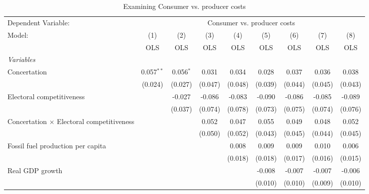 
\begin{table}[htbp]
   \caption{Examining Consumer vs. producer costs}
   \centering
   \begin{tabular}{lcccccccc}
      \toprule
      Dependent Variable: & \multicolumn{8}{c}{Consumer vs. producer costs}\\
      Model:                                           & (1)          & (2)         & (3)     & (4)     & (5)     & (6)     & (7)     & (8)\\  
                                                       &  OLS         & OLS         & OLS     & OLS     & OLS     & OLS     & OLS     & OLS\\  
      \midrule
      \emph{Variables}\\
      Concertation                                     & 0.057$^{**}$ & 0.056$^{*}$ & 0.031   & 0.034   & 0.028   & 0.037   & 0.036   & 0.038\\   
                                                       & (0.024)      & (0.027)     & (0.047) & (0.048) & (0.039) & (0.044) & (0.045) & (0.043)\\   
      Electoral competitiveness                        &              & -0.027      & -0.086  & -0.083  & -0.090  & -0.086  & -0.085  & -0.089\\   
                                                       &              & (0.037)     & (0.074) & (0.078) & (0.073) & (0.075) & (0.074) & (0.076)\\   
      Concertation $\times$ Electoral competitiveness  &              &             & 0.052   & 0.047   & 0.055   & 0.049   & 0.048   & 0.052\\   
                                                       &              &             & (0.050) & (0.052) & (0.043) & (0.045) & (0.044) & (0.045)\\   
      Fossil fuel production per capita                &              &             &         & 0.008   & 0.009   & 0.009   & 0.010   & 0.006\\   
                                                       &              &             &         & (0.018) & (0.018) & (0.017) & (0.016) & (0.015)\\   
      Real GDP growth                                  &              &             &         &         & -0.008  & -0.007  & -0.007  & -0.006\\   
                                                       &              &             &         &         & (0.010) & (0.010) & (0.009) & (0.010)\\   

\end{tabular}
\end{table}
